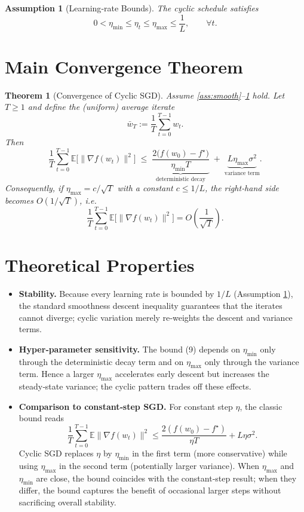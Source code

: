 \documentclass{article}
\newtheorem{theorem}{Theorem}
\newtheorem{assumption}{Assumption}
\begin{document}
\begin{assumption}[Learning‑rate Bounds]\label{ass:lr}
The cyclic schedule satisfies
\[
0<\eta_{\min}\le \eta_t\le\eta_{\max}\le\frac{1}{L},\qquad\forall t.
\tag{8}
\]
\end{assumption}

\section*{Main Convergence Theorem}
\begin{theorem}[Convergence of Cyclic SGD]\label{thm:main}
Assume \ref{ass:smooth}–\ref{ass:lr} hold. Let $T\ge1$ and define the (uniform) average iterate
\[
\bar w_T:=\frac1T\sum_{t=0}^{T-1}w_t .
\]
Then
\[
\frac1T\sum_{t=0}^{T-1}\mathbb{E}\bigl[\|\nabla f(w_t)\|^2\bigr]
\;\le\;
\underbrace{\frac{2\bigl(f(w_0)-f^\star\bigr)}{\eta_{\min}T}}_{\text{deterministic decay}}
\;+\;
\underbrace{L\eta_{\max}\sigma^2}_{\text{variance term}} .
\tag{9}
\]
Consequently, if $\eta_{\max}=c/\sqrt{T}$ with a constant $c\le 1/L$, the right‑hand side becomes $O(1/\sqrt{T})$, i.e.
\[
\frac1T\sum_{t=0}^{T-1}\mathbb{E}\bigl[\|\nabla f(w_t)\|^2\bigr]=O\!\left(\frac{1}{\sqrt{T}}\right).
\tag{10}
\]
\end{theorem}

\section*{Theoretical Properties}
\begin{itemize}[leftmargin=*,itemsep=2pt]
\item \textbf{Stability.} Because every learning rate is bounded by $1/L$ (Assumption \ref{ass:lr}), the standard smoothness descent inequality guarantees that the iterates cannot diverge; cyclic variation merely re‑weights the descent and variance terms.
\item \textbf{Hyper‑parameter sensitivity.} The bound (9) depends on $\eta_{\min}$ only through the deterministic decay term and on $\eta_{\max}$ only through the variance term. Hence a larger $\eta_{\max}$ accelerates early descent but increases the steady‑state variance; the cyclic pattern trades off these effects.
\item \textbf{Comparison to constant‑step SGD.} For constant step $\eta$, the classic bound reads  
\[
\frac1T\sum_{t=0}^{T-1}\mathbb{E}\|\nabla f(w_t)\|^2\le\frac{2(f(w_0)-f^\star)}{\eta T}+L\eta\sigma^2 .
\]  
Cyclic SGD replaces $\eta$ by $\eta_{\min}$ in the first term (more conservative) while using $\eta_{\max}$ in the second term (potentially larger variance). When $\eta_{\max}$ and $\eta_{\min}$ are close, the bound coincides with the constant‑step result; when they differ, the bound captures the benefit of occasional larger steps without sacrificing overall stability.
\end{itemize}
\end{document}
